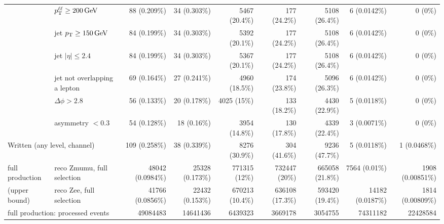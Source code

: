 \begin{tabular}{llrrrrrrr}
 & $p_{\mathrm{T}}^{\ell\ell} \geq 200\,\mathrm{GeV}$ & 88 (0.209\%) & 34 (0.303\%) & 5467 (20.4\%) & 177 (24.2\%) & 5108 (26.4\%) & 6 (0.0142\%) & 0 (0\%) \\
 & jet $p_{\mathrm{T}} \geq 150\,\mathrm{GeV}$ & 84 (0.199\%) & 34 (0.303\%) & 5392 (20.1\%) & 177 (24.2\%) & 5108 (26.4\%) & 6 (0.0142\%) & 0 (0\%) \\
 & jet $|\eta| \leq 2.4$ & 84 (0.199\%) & 34 (0.303\%) & 5367 (20.1\%) & 177 (24.2\%) & 5108 (26.4\%) & 6 (0.0142\%) & 0 (0\%) \\
 & jet not overlapping a lepton & 69 (0.164\%) & 27 (0.241\%) & 4960 (18.5\%) & 174 (23.8\%) & 5096 (26.3\%) & 6 (0.0142\%) & 0 (0\%) \\
 & $\Delta\phi > 2.8$ & 56 (0.133\%) & 20 (0.178\%) & 4025 (15\%) & 133 (18.2\%) & 4430 (22.9\%) & 5 (0.0118\%) & 0 (0\%) \\
 & asymmetry $< 0.3$ & 54 (0.128\%) & 18 (0.16\%) & 3954 (14.8\%) & 130 (17.8\%) & 4339 (22.4\%) & 3 (0.0071\%) & 0 (0\%) \\
\midrule
\multicolumn{2}{l}{Written (any level, channel)} & 109 (0.258\%) & 38 (0.339\%) & 8276 (30.9\%) & 304 (41.6\%) & 9236 (47.7\%) & 5 (0.0118\%) & 1 (0.0468\%) \\
\midrule
full production & reco Zmumu, full selection & 48042 (0.0984\%) & 25328 (0.173\%) & 771315 (12\%) & 732447 (20\%) & 665058 (21.8\%) & 7564 (0.01\%) & 1908 (0.00851\%) \\
(upper bound) & reco Zee, full selection & 41766 (0.0856\%) & 22432 (0.153\%) & 670213 (10.4\%) & 636108 (17.3\%) & 593420 (19.4\%) & 14182 (0.0187\%) & 1814 (0.00809\%) \\
\multicolumn{2}{l}{full production: processed events} & 49084483 & 14641436 & 6439323 & 3669178 & 3054755 & 74311182 & 22428584 \\
\bottomrule
\end{tabular}
